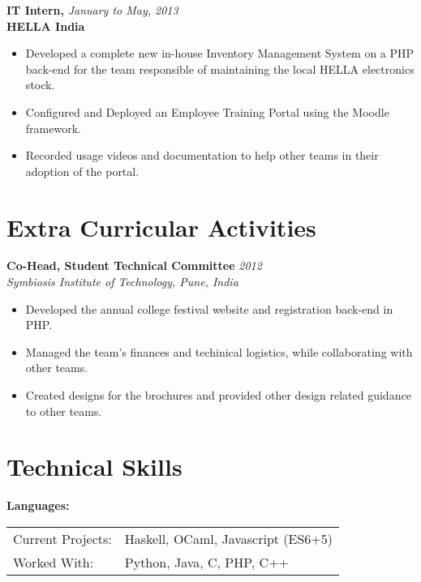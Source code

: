 \documentclass[a4paper,overlapped]{res}
\begin{document}
\begin{resume}
  \textbf{IT Intern,} \hfill \textit{January to May, 2013}\\
  \textbf{HELLA India}
  \begin{itemize}
  \item Developed a complete new in-house Inventory Management System on a PHP
    back-end for the team responsible of maintaining the local HELLA electronics stock.
  \item Configured and Deployed an Employee Training Portal using the
    Moodle framework.
  \item Recorded usage videos and documentation to help other teams in their
    adoption of the portal.
  \end{itemize}

  \section{Extra Curricular Activities}  

  \textbf{Co-Head, Student Technical Committee}   \hfill \textit{2012} \\
  \textit{Symbiosis Institute of Technology, Pune, India}
  \begin{itemize}
  \item Developed the annual college festival website and registration back-end
    in PHP.
  \item Managed the team's finances and techinical logistics, while collaborating 
    with other teams.
  \item Created designs for the brochures and provided other design related guidance to
    other teams.
  \end{itemize}

  \section{Technical Skills} 
  \textbf{Languages:} \\ 
  \begin{tabular}{l l}
    Current Projects: & Haskell, OCaml, Javascript (ES6+5) \\ 
    Worked With: & Python, Java, C, PHP, C++ \\
  \end{tabular}\\


\end{resume}
\end{document}
